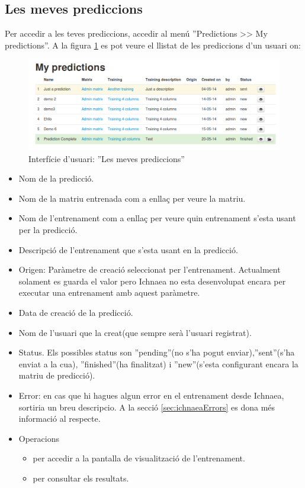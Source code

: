 \subsection{Les meves prediccions}
\label{subsec:myPrediccions}
Per accedir a les teves prediccions, accedir al menú ''Predictions >> My predictions''. A la figura \ref{fig:my_predictions} es pot veure el llistat de les prediccions d'un usuari on:
\begin{figure}[h!]
  \centering
  \includegraphics[scale=0.4]{img/userguide/my_predictions.png}
  \caption{Interfície d'usuari: ''Les meves prediccions''}
  \label{fig:my_predictions}
\end{figure}
\begin{itemize}
\item Nom de la predicció.
\item Nom de la matriu entrenada com a enllaç per veure la matriu.
\item Nom de l'entrenament com a enllaç per veure quin entrenament s'esta usant per la predicció.
\item Descripció de l'entrenament que s'esta usant en la predicció.
\item Origen: Paràmetre de creació seleccionat per l'entrenament. Actualment solament es guarda el valor pero Ichnaea no esta desenvolupat encara per executar una entrenament amb aquest paràmetre.
\item Data de creaci\'{o} de la predicció.
\item Nom de l'usuari que la creat(que sempre serà l'usuari registrat).
\item Status. Els possibles status son ''pending''(no s'ha pogut enviar),''sent''(s'ha enviat a la cua), ''finished''(ha finalitzat) i ''new''(s'esta configurant encara la matriu de predicció).
\item Error: en cas que hi hagues algun error en el entrenament desde Ichnaea, sortiria un breu descripcio. A la secció \ref{sec:ichnaeaErrors} es dona m\'{e}s informació al respecte.
\item Operacions
 \begin{itemize}
 \item \iconeyeopen per accedir a la pantalla de visualització de l'entrenament.
 \item \iconresults per consultar els resultats.
 \end{itemize}
\end{itemize}

